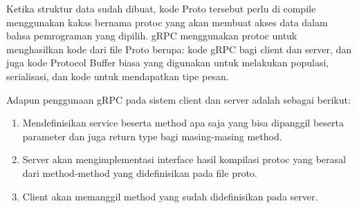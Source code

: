 Ketika struktur data sudah dibuat, kode Proto tersebut perlu di compile menggunakan kakas bernama protoc yang akan membuat akses data dalam bahsa pemrograman yang dipilih.
gRPC menggunakan protoc untuk menghasilkan kode dari file Proto berupa: kode gRPC bagi client dan server, dan juga kode Protocol Buffer biasa yang digunakan untuk melakukan populasi, serialisasi, dan kode untuk mendapatkan tipe pesan.

Adapun penggunaan gRPC pada sistem client dan server adalah sebagai berikut:
\begin{enumerate}
	\item Mendefinisikan service beserta method apa saja yang bisa dipanggil beserta parameter dan juga return type bagi masing-masing method.
	\item  Server akan mengimplementasi interface hasil kompilasi protoc yang berasal dari method-method yang didefinisikan pada file proto.
	\item Client akan memanggil method yang sudah didefinisikan pada server.
\end{enumerate}



